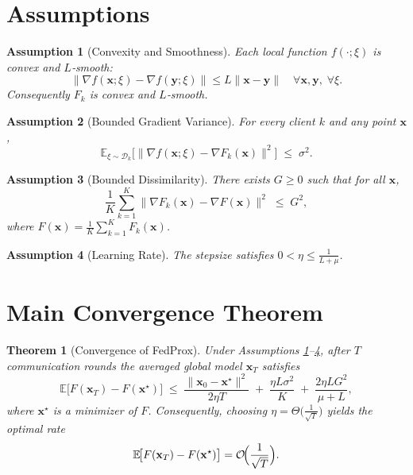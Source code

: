 \documentclass{article}
\newtheorem{theorem}{Theorem}
\newtheorem{assumption}{Assumption}
\begin{document}
\newpage

\section*{Assumptions}
\begin{assumption}[Convexity and Smoothness]\label{ass:conv_smooth}
Each local function $f(\cdot;\xi)$ is convex and $L$‑smooth:
\[
    \|\nabla f(\mathbf{x};\xi)-\nabla f(\mathbf{y};\xi)\|\le L\|\mathbf{x}-\mathbf{y}\|
    \quad\forall\mathbf{x},\mathbf{y},\;\forall\xi.
\]
Consequently $F_k$ is convex and $L$‑smooth.
\end{assumption}

\begin{assumption}[Bounded Gradient Variance]\label{ass:var}
For every client $k$ and any point $\mathbf{x}$,
\[
    \mathbb{E}_{\xi\sim\mathcal{D}_k}\!\bigl[\| \nabla f(\mathbf{x};\xi)-\nabla F_k(\mathbf{x})\|^2\bigr]
    \;\le\; \sigma^2.
\]
\end{assumption}

\begin{assumption}[Bounded Dissimilarity]\label{ass:hetero}
There exists $G\ge0$ such that for all $\mathbf{x}$,
\[
    \frac{1}{K}\sum_{k=1}^{K}\|\nabla F_k(\mathbf{x})-\nabla F(\mathbf{x})\|^2
    \;\le\; G^2,
\]
where $F(\mathbf{x})=\frac{1}{K}\sum_{k=1}^{K}F_k(\mathbf{x})$.
\end{assumption}

\begin{assumption}[Learning Rate]\label{ass:lr}
The stepsize satisfies $0<\eta\le \frac{1}{L+\mu}$.
\end{assumption}

\section*{Main Convergence Theorem}
\begin{theorem}[Convergence of FedProx]\label{thm:fedprox}
Under Assumptions \ref{ass:conv_smooth}–\ref{ass:lr}, after $T$ communication rounds the averaged global model $\mathbf{x}_T$ satisfies
\[
    \mathbb{E}\!\bigl[F(\mathbf{x}_T)-F(\mathbf{x}^\star)\bigr]
    \;\le\;
    \frac{\|\mathbf{x}_0-\mathbf{x}^\star\|^2}{2\eta T}
    \;+\;
    \frac{\eta L\sigma^2}{K}
    \;+\;
    \frac{2\eta L G^2}{\mu+L},
\tag{3}
\]
where $\mathbf{x}^\star$ is a minimizer of $F$.
Consequently, choosing $\eta = \Theta\!\bigl(\tfrac{1}{\sqrt{T}}\bigr)$ yields the optimal rate
\[
    \mathbb{E}\!\bigl[F(\mathbf{x}_T)-F(\mathbf{x}^\star)\bigr]=\mathcal{O}\!\Bigl(\frac{1}{\sqrt{T}}\Bigr).
\]
\end{theorem}
\end{document}

